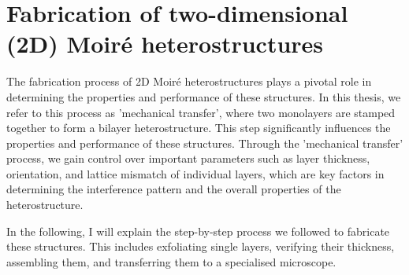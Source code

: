\section{Fabrication of two-dimensional (2D) Moiré heterostructures}
\label{sec:methods}
%


The fabrication process of 2D Moir\'e heterostructures plays a pivotal role in determining the properties and performance of these structures. In this thesis, we refer to this process as 'mechanical transfer', where two monolayers are stamped together to form a bilayer heterostructure. This step significantly influences the properties and performance of these structures. 
%
Through the 'mechanical transfer' process, we gain control over important parameters such as layer thickness, orientation, and lattice mismatch of individual layers, which are key factors in determining the interference pattern and the overall properties of the heterostructure.

In the following, I will explain the step-by-step process we followed to fabricate these structures. This includes exfoliating single layers, verifying their thickness, assembling them, and transferring them to a specialised microscope.


